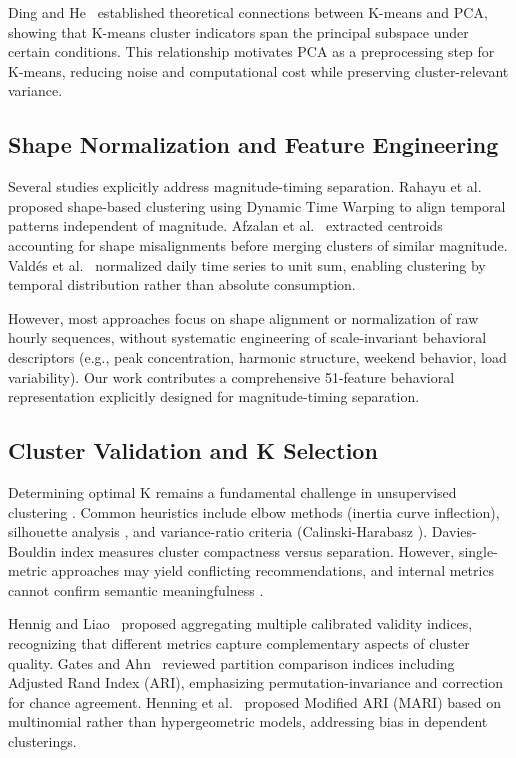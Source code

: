 Ding and He~\cite{ding2004kmeans} established theoretical connections between K-means and PCA, showing that K-means cluster indicators span the principal subspace under certain conditions. This relationship motivates PCA as a preprocessing step for K-means, reducing noise and computational cost while preserving cluster-relevant variance.

\subsection{Shape Normalization and Feature Engineering}

Several studies explicitly address magnitude-timing separation. Rahayu et al.~\cite{rahayu2021shape} proposed shape-based clustering using Dynamic Time Warping to align temporal patterns independent of magnitude. Afzalan et al.~\cite{afzalan2020twostage} extracted centroids accounting for shape misalignments before merging clusters of similar magnitude. Vald\'es et al.~\cite{valdes2021smart} normalized daily time series to unit sum, enabling clustering by temporal distribution rather than absolute consumption.

However, most approaches focus on shape alignment or normalization of raw hourly sequences, without systematic engineering of scale-invariant behavioral descriptors (e.g., peak concentration, harmonic structure, weekend behavior, load variability). Our work contributes a comprehensive 51-feature behavioral representation explicitly designed for magnitude-timing separation.

\subsection{Cluster Validation and K Selection}

Determining optimal K remains a fundamental challenge in unsupervised clustering \cite{hennig2020comparing}. Common heuristics include elbow methods (inertia curve inflection), silhouette analysis \cite{rousseeuw1987silhouettes}, and variance-ratio criteria (Calinski-Harabasz \cite{calinski1974dendrite}). Davies-Bouldin index \cite{davies1979cluster} measures cluster compactness versus separation. However, single-metric approaches may yield conflicting recommendations, and internal metrics cannot confirm semantic meaningfulness \cite{gates2019adjusted}.

Hennig and Liao~\cite{hennig2020comparing} proposed aggregating multiple calibrated validity indices, recognizing that different metrics capture complementary aspects of cluster quality. Gates and Ahn~\cite{gates2019adjusted} reviewed partition comparison indices including Adjusted Rand Index (ARI), emphasizing permutation-invariance and correction for chance agreement. Henning et al.~\cite{henning2020adjusting} proposed Modified ARI (MARI) based on multinomial rather than hypergeometric models, addressing bias in dependent clusterings.

